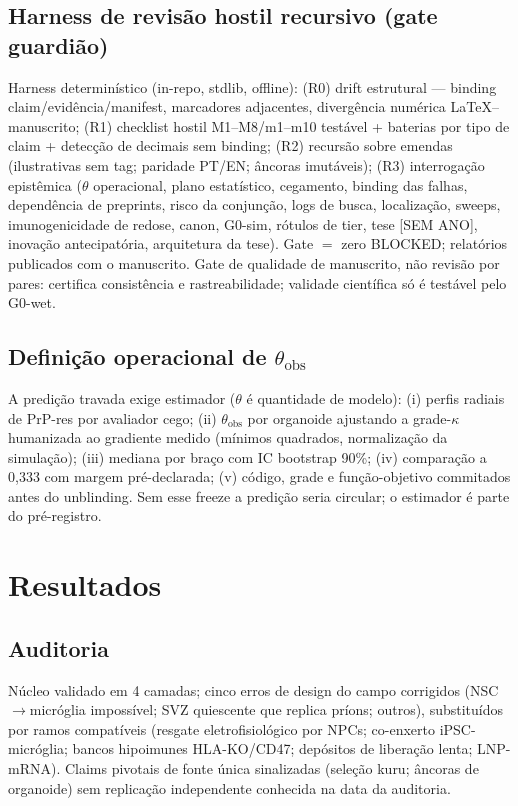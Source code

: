 \documentclass[10pt,twocolumn]{article}
\begin{document}
\subsection{Harness de revisão hostil recursivo (gate guardião)}
Harness determinístico (in-repo, stdlib, offline): (R0) drift estrutural --- binding claim/evidência/manifest, marcadores adjacentes, divergência numérica LaTeX--manuscrito; (R1) checklist hostil M1--M8/m1--m10 testável + baterias por tipo de claim + detecção de decimais sem binding; (R2) recursão sobre emendas (ilustrativas sem tag; paridade PT/EN; âncoras imutáveis); (R3) interrogação epistêmica ($\theta$ operacional, plano estatístico, cegamento, binding das falhas, dependência de preprints, risco da conjunção, logs de busca, localização, sweeps, imunogenicidade de redose, canon, G0-sim, rótulos de tier, tese [SEM ANO], inovação antecipatória, arquitetura da tese). Gate $=$ zero BLOCKED; relatórios publicados com o manuscrito. Gate de qualidade de manuscrito, não revisão por pares: certifica consistência e rastreabilidade; validade científica só é testável pelo G0-wet.

\subsection{Definição operacional de $\theta_{\text{obs}}$}
A predição travada exige estimador ($\theta$ é quantidade de modelo): (i) perfis radiais de PrP-res por avaliador cego; (ii) $\theta_{\text{obs}}$ por organoide ajustando a grade-$\kappa$ humanizada ao gradiente medido (mínimos quadrados, normalização da simulação); (iii) mediana por braço com IC bootstrap 90\%; (iv) comparação a 0,333 com margem pré-declarada; (v) código, grade e função-objetivo commitados antes do unblinding. Sem esse freeze a predição seria circular; o estimador é parte do pré-registro.

\section{Resultados}
\subsection{Auditoria}
Núcleo validado em 4 camadas; cinco erros de design do campo corrigidos (NSC$\to$micróglia impossível; SVZ quiescente que replica príons; outros), substituídos por ramos compatíveis (resgate eletrofisiológico por NPCs; co-enxerto iPSC-micróglia; bancos hipoimunes HLA-KO/CD47; depósitos de liberação lenta; LNP-mRNA). Claims pivotais de fonte única sinalizadas (seleção kuru; âncoras de organoide) sem replicação independente conhecida na data da auditoria.
\end{document}
